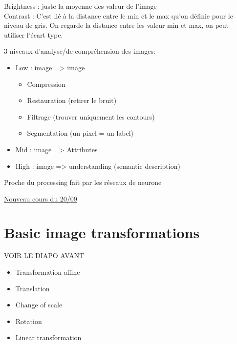 \documentclass{article}
\theoremstyle{plain}%
\theoremstyle{definition}
\theoremstyle{remark}
\begin{document}
Brightness : juste la moyenne des valeur de l'image \\
Contrast : C'est lié à la distance entre le min et le max qu'on définie pour le niveau de gris. On regarde la distance entre les valeur min et max, on peut utiliser l'écart type. 

3 niveaux d'analyse/de compréhension des images:
\begin{itemize}
    \item Low : image => image \begin{itemize}
        \item Compression 
        \item Restauration (retirer le bruit)
        \item Filtrage (trouver uniquement les contours)
        \item Segmentation (un pixel = un label)
    \end{itemize}
    \item Mid : image => Attributes 
    \item High : image => understanding (semantic description)
\end{itemize}
Proche du processing fait par les réseaux de neurone

\underline{Nouveau cours du 20/09} \\

\section{Basic image transformations}
VOIR LE DIAPO AVANT 
\begin{itemize}
    \item Transformation affine
    \item Translation
    \item Change of scale
    \item Rotation
    \item Linear transformation
\end{itemize}
\end{document}
